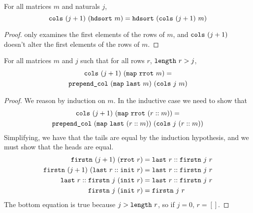 \documentclass[sigplan,10pt,anonymous,review]{thesis}
\begin{document}
\begin{lemma}
  For all matrices $m$ and naturals $j$,
  \begin{equation*}
    \texttt{\textup{cols}}~(j+1)~(\texttt{\textup{hdsort}}~m) = \texttt{\textup{hdsort}}~(\texttt{\textup{cols}}~(j+1)~m)
  \end{equation*}
\end{lemma}
\begin{proof}
   only examines the first elements of the rows of $m$,
  and $\texttt{\textup{cols}}~(j+1)$ doesn't alter the first elements of the rows
  of $m$.
\end{proof}

\begin{lemma}
  For all matrices $m$ and $j$ such that for all rows $r$,
  $\texttt{\textup{length}}~r > j$,
  \begin{gather*}
    \texttt{\textup{cols}}~(j+1)~(\texttt{\textup{map}}~\texttt{\textup{rrot}}~m) = \\
    \texttt{\textup{prepend\_col}}~(\texttt{\textup{map}}~\texttt{\textup{last}}~m)~(\texttt{\textup{cols}}~j~m)
  \end{gather*}
\end{lemma}
\begin{proof}
  We reason by induction on $m$. In the inductive case we need to show that
  \begin{gather*}
    \texttt{\textup{cols}}~(j+1)~(\texttt{\textup{map}}~\texttt{\textup{rrot}}~(r::m)) = \\
    \texttt{\textup{prepend\_col}}~(\texttt{\textup{map}}~\texttt{\textup{last}}~(r::m))~(\texttt{\textup{cols}}~j~(r::m))
  \end{gather*}
  Simplifying, we have that the tails are equal by the induction
  hypothesis, and we must show that the heads are equal.
  \begin{align*}
    \texttt{\textup{firstn}}~(j+1)~(\texttt{\textup{rrot}}~r) &= \texttt{\textup{last}}~r :: \texttt{\textup{firstn}}~j~r \\
    \texttt{\textup{firstn}}~(j+1)~(\texttt{\textup{last}}~r :: \texttt{\textup{init}}~r) &= \texttt{\textup{last}}~r
    :: \texttt{\textup{firstn}}~j~r \\
    \texttt{\textup{last}}~r :: \texttt{\textup{firstn}}~j~(\texttt{\textup{init}}~r) &= \texttt{\textup{last}}~r :: \texttt{\textup{firstn}}~j~r \\
    \texttt{\textup{firstn}}~j~(\texttt{\textup{init}}~r) &= \texttt{\textup{firstn}}~j~r
  \end{align*}
  The bottom equation is true because $j > \texttt{\textup{length}}~r$, so if $j=
  0$, $r = []$.
\end{proof}
\end{document}
